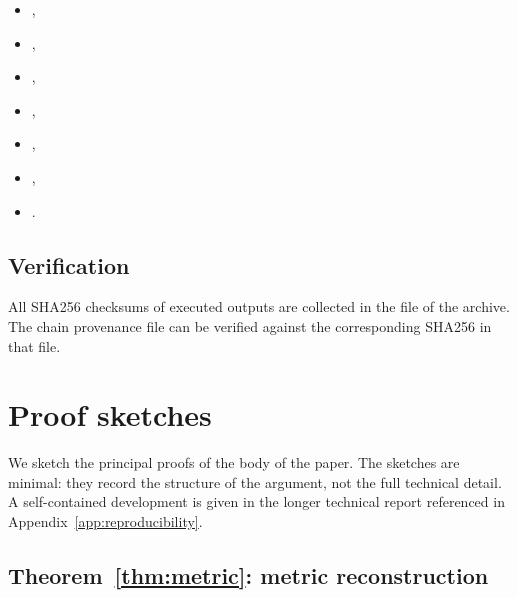 ﻿\documentclass[12pt,a4paper]{article}
\theoremstyle{definition}
\begin{document}
\begin{itemize}
  \item {},
  \item {},
  \item {},
  \item {},
  \item {},
  \item {},
  \item {}.
\end{itemize}

\subsection{Verification}

All SHA256 checksums of executed outputs are collected in the file  of the archive. The chain provenance file  can be verified against the corresponding SHA256 in that file.

\section{Proof sketches}
\label{app:proofs}

We sketch the principal proofs of the body of the paper. The sketches are minimal: they record the structure of the argument, not the full technical detail. A self-contained development is given in the longer technical report referenced in Appendix~\ref{app:reproducibility}.

\subsection{Theorem~\ref{thm:metric}: metric reconstruction}
\end{document}

